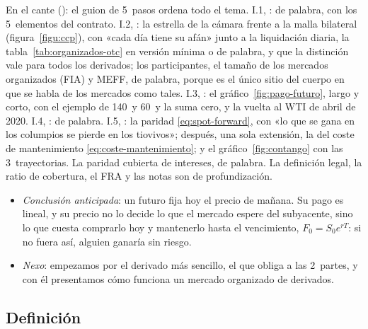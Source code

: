 \documentclass[11pt]{article}
\begin{document}
\begin{notaopositor}
En el cante (): el guion de 5~pasos ordena todo el tema. I.1, : de palabra, con los 5~elementos del contrato. I.2, : la estrella de la cámara frente a la malla bilateral (figura~\ref{figu:ccp}), con «cada día tiene su afán» junto a la liquidación diaria, la tabla~\ref{tab:organizados-otc} en versión mínima o de palabra, y que la distinción vale para todos los derivados; los participantes, el tamaño de los mercados organizados (FIA) y MEFF, de palabra, porque es el único sitio del cuerpo en que se habla de los mercados como tales. I.3, : el gráfico~\ref{fig:pago-futuro}, largo y corto, con el ejemplo de 140~y 60~y la suma cero, y la vuelta al WTI de abril de 2020. I.4, : de palabra. I.5, : la paridad \eqref{eq:spot-forward}, con «lo que se gana en los columpios se pierde en los tiovivos»; después, una sola extensión, la del coste de mantenimiento \eqref{eq:coste-mantenimiento}; y el gráfico~\ref{fig:contango} con las 3~trayectorias. La paridad cubierta de intereses, de palabra. La definición legal, la ratio de cobertura, el FRA y las notas son de profundización.
\end{notaopositor}

\begin{itemize}
\item \emph{Conclusión anticipada}: un futuro fija hoy el precio de mañana. Su pago es lineal, y su precio no lo decide lo que el mercado espere del subyacente, sino lo que cuesta comprarlo hoy y mantenerlo hasta el vencimiento, $F_0=S_0e^{rT}$: si no fuera así, alguien ganaría sin riesgo.
\item \emph{Nexo}: empezamos por el derivado más sencillo, el que obliga a las 2~partes, y con él presentamos cómo funciona un mercado organizado de derivados.
\end{itemize}

\subsection{Definición}\label{sec:definicion-futuros}
\end{document}
